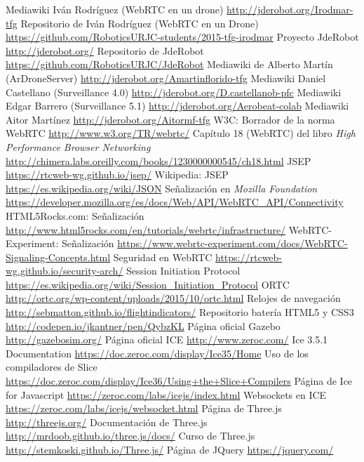 \documentclass[oneside,a4paper,12pt]{book}
\begin{document}
\begin{thebibliography}{99}

 Mediawiki Iván Rodríguez (WebRTC en un drone) \url{http://jderobot.org/Irodmar-tfg}
 Repositorio de Iván Rodríguez (WebRTC en un Drone) \url{https://github.com/RoboticsURJC-students/2015-tfg-irodmar} 
 Proyecto JdeRobot \url{http://jderobot.org/} 
 Repositorio de JdeRobot \url{https://github.com/RoboticsURJC/JdeRobot} 
 Mediawiki de Alberto Martín (ArDroneServer) \url{http://jderobot.org/Amartinflorido-tfg}
 Mediawiki Daniel Castellano (Surveillance 4.0) \url{http://jderobot.org/D.castellanob-pfc} 
 Mediawiki Edgar Barrero (Surveillance 5.1) \url{http://jderobot.org/Aerobeat-colab}
 Mediawiki Aitor Martínez \url{http://jderobot.org/Aitormf-tfg}
 W3C: Borrador de la norma WebRTC \url{http://www.w3.org/TR/webrtc/}
 Capítulo 18 (WebRTC) del libro \emph{High Performance Browser Networking} \url{http://chimera.labs.oreilly.com/books/1230000000545/ch18.html}
 JSEP  \url{https://rtcweb-wg.github.io/jsep/}
 Wikipedia: JSEP  \url{https://es.wikipedia.org/wiki/JSON}
 Señalización en \emph{Mozilla Foundation} \url{https://developer.mozilla.org/es/docs/Web/API/WebRTC_API/Connectivity}
 HTML5Rocks.com: Señalización \url{http://www.html5rocks.com/en/tutorials/webrtc/infrastructure/}
 WebRTC-Experiment: Señalización \url{https://www.webrtc-experiment.com/docs/WebRTC-Signaling-Concepts.html}
 Seguridad en WebRTC \url{https://rtcweb-wg.github.io/security-arch/}
 Session Initiation Protocol \url{https://es.wikipedia.org/wiki/Session_Initiation_Protocol}
 ORTC \url{http://ortc.org/wp-content/uploads/2015/10/ortc.html}
 Relojes de navegación \url{http://sebmatton.github.io/flightindicators/}
 Repositorio batería HTML5 y CSS3 \url{http://codepen.io/jkantner/pen/QybzKL}
 Página oficial Gazebo \url{http://gazebosim.org/}
 Página oficial ICE  \url{http://www.zeroc.com/}
Ice 3.5.1 Documentation  \url{https://doc.zeroc.com/display/Ice35/Home}
 Uso de los compiladores de Slice \url{https://doc.zeroc.com/display/Ice36/Using+the+Slice+Compilers}
 Página de Ice for Javascript  \url{https://zeroc.com/labs/icejs/index.html}
 Websockets en ICE \url{https://zeroc.com/labs/icejs/websocket.html}
 Página de Three.js \url{http://threejs.org/}
 Documentación de Three.js \url{http://mrdoob.github.io/three.js/docs/}
 Curso de Three.js \url{http://stemkoski.github.io/Three.js/}
 Página de JQuery \url{https://jquery.com/}

\end{thebibliography} 
\end{document}
